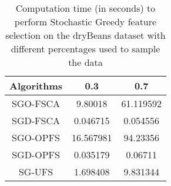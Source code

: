 \begin{table}
	\begin{center}
		\begin{tabular}{c c c}
			Algorithms & 0.3 & 0.7 \\
			\hline
			SGO-FSCA & 9.80018 & 61.119592 \\
			SGD-FSCA & 0.046715 & 0.054556 \\
			SGO-OPFS & 16.567981 & 94.23356 \\
			SGD-OPFS & 0.035179 & 0.06711 \\
			SG-UFS & 1.698408 & 9.831344 \\
		\end{tabular}
	\end{center}
	\caption{Computation time (in seconds) to perform Stochastic Greedy feature selection on the dryBeans dataset with different percentages used to sample the data}
\end{table}